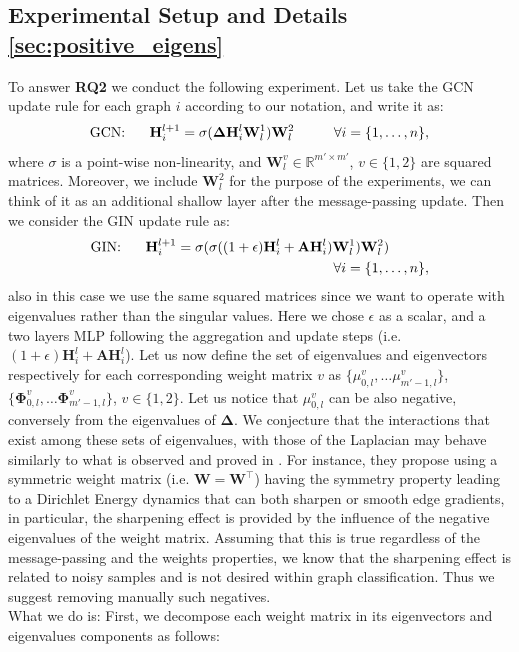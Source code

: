 \documentclass[twoside]{article}
\theoremstyle{definition}
\begin{document}
\subsection{Experimental Setup and Details \ref{sec:positive_eigens}}
\label{app: weightmatrice_eigens}
To answer \textbf{RQ2} we conduct the following experiment.
Let us take the GCN \cite{gcn} update rule for each graph $i$ according to our notation, and write it as: 
\begin{equation}
    \text{GCN: \hspace{0.5cm}}
    \mathbf{H}_i^{l+1} = \sigma(\mathbf{\Delta}\mathbf{H}_i^{l}\mathbf{W}^1_l)\mathbf{W}^2_l \text{\hspace{1cm}} \forall i = \{1, \ldots, n\},
\end{equation}
where $\sigma$ is a point-wise non-linearity, and $\mathbf{W}_l^v \in \mathbb{R}^{m' \times m'}$, $v \in \{1, 2\}$ are squared matrices. Moreover, we include $\mathbf{W}_l^2$ for the purpose of the experiments, we can think of it as an additional shallow layer after the message-passing update. Then we consider the GIN \cite{WL1} update rule as: 
\begin{align*}
    \text{GIN: \hspace{0.5cm}}
    \mathbf{H}_i^{l+1} = \sigma(\sigma((1 + \epsilon)\mathbf{H}_i^{l} + \mathbf{A}\mathbf{H}_i^{l})\mathbf{W}_{l}^1)\mathbf{W}_{l}^2) \text{\hspace{1cm}} \\
    \forall i = \{1, \ldots, n\},
\end{align*}
also in this case we use the same squared matrices since we want to operate with eigenvalues rather than the singular values. Here we chose $\epsilon$ as a scalar, and a two layers MLP following the aggregation and update steps (i.e. $(1 + \epsilon)\mathbf{H}_i^{l} +\mathbf{A}\mathbf{H}_i^{l}$). 
Let us now define the set of eigenvalues and eigenvectors respectively for each corresponding weight matrix $v$ as $\{\mu_{0,l}^{v}, \ldots \mu_{m'-1,l}^{v}\}$, $\{\bm{\Phi}_{0,l}^{v}, \ldots \bm{\Phi}_{m'-1,l}^{v}\}$, $v \in \{1, 2\}$. Let us notice that $\mu_{0,l}^v$ can be also negative, conversely from the eigenvalues of $\mathbf{\Delta}$. We conjecture that the interactions that exist among these sets of eigenvalues, with those of the Laplacian may behave similarly to what is observed and proved in \cite{GRAFF}. For instance, they propose using a symmetric weight matrix (i.e. $\mathbf{W} = \mathbf{W}^{\top}$) having the symmetry property leading to a Dirichlet Energy dynamics that can both sharpen or smooth edge gradients, in particular, the sharpening effect is provided by the influence of the negative eigenvalues of the weight matrix. Assuming that this is true regardless of the message-passing and the weights properties, we know that the sharpening effect is related to noisy samples and is not desired within graph classification. Thus we suggest removing manually such negatives.  \\What we do is: First, we decompose each weight matrix in its eigenvectors and eigenvalues components as follows:
\end{document}
